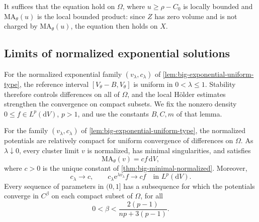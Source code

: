 It suffices that the equation hold on $\Omega$, where $u\geq\rho-C_0$ is locally bounded and $\mathrm{MA}_\theta(u)$ is the local bounded product: since $Z$ has zero volume and is not charged by $\mathrm{MA}_\theta(u)$, the equation then holds on $X$.

\subsection{Limits of normalized exponential solutions}

For the normalized exponential family $(v_\lambda,c_\lambda)$ of \cref{lem:big-exponential-uniform-type}, the reference interval $[V_\theta-B,V_\theta]$ is uniform in $0<\lambda\leq1$. Stability therefore controls differences on all of $\Omega$, and the local H\"older estimates strengthen the convergence on compact subsets. We fix the nonzero density $0\leq f\in L^p(\mathrm{d}V)$, $p>1$, and use the constants $B,C,m$ of that lemma.

\begin{proposition}\label{prop:big-exponential-clusters}
For the family $(v_\lambda,c_\lambda)$ of \cref{lem:big-exponential-uniform-type}, the normalized potentials are relatively compact for uniform convergence of differences on $\Omega$. As $\lambda\downarrow0$, every cluster limit $v$ is normalized, has minimal singularities, and satisfies
\[
 \mathrm{MA}_\theta(v)=cf\,\mathrm{d}V,
\]
where $c>0$ is the unique constant of \cref{thm:big-minimal-normalized}. Moreover,
\[
 c_\lambda\longrightarrow c,
 \qquad c_\lambda\mathrm{e}^{\lambda v_\lambda}f
          \longrightarrow cf\quad\text{in }L^p(\mathrm{d}V).
\]
Every sequence of parameters in $(0,1]$ has a subsequence for which the potentials converge in $C^\beta$ on each compact subset of $\Omega$, for all
\[
 0<\beta<\frac{2(p-1)}{np+3(p-1)}.
\]
\end{proposition}

